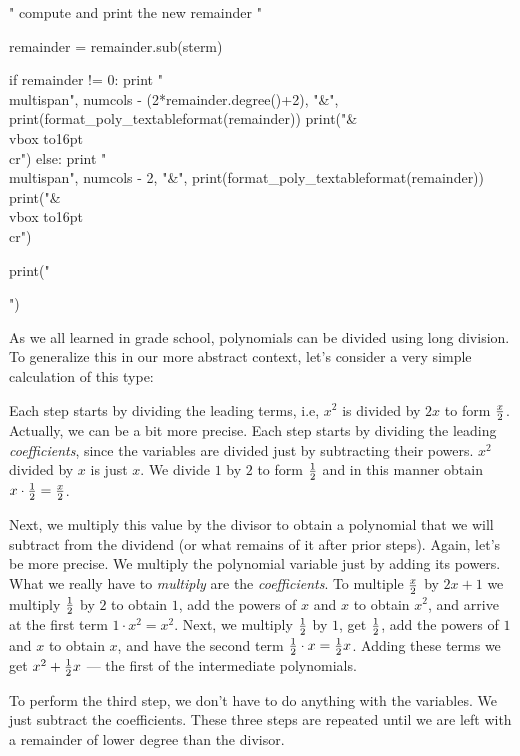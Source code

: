\begin{sympycode}
{{      " compute and print the new remainder "

      remainder = remainder.sub(sterm)

      if remainder != 0:
         print "\\multispan{", numcols - (2*remainder.degree()+2), "}&",
         print(format_poly_textableformat(remainder))
         print("&\\vbox to16pt{}\\cr")
      else:
         print "\\multispan{", numcols - 2, "}&",
         print(format_poly_textableformat(remainder))
         print("&\\vbox to16pt{}\\cr")

   print("}}")
\end{sympycode}

As we all learned in grade school, polynomials can be divided
using long division.  To generalize this in our more abstract
context, let's consider a very simple calculation of this type:


Each step starts by dividing the leading terms, i.e, $x^2$ is divided
by $2x$ to form $x\over 2$.  Actually, we can be a bit more precise.
Each step starts by dividing the leading {\it coefficients},
since the variables are divided just by subtracting their
powers. $x^2$ divided by $x$ is just $x$.  We divide $1$ by $2$
to form $1\over2$ and in this manner obtain $x\cdot{1\over2}={x\over2}$.

Next, we multiply this value by the divisor to obtain a polynomial
that we will subtract from the dividend (or what remains of it after
prior steps).  Again, let's be more precise.  We multiply the
polynomial variable just by adding its powers.  What we really have to
{\it multiply} are the {\it coefficients}.  To multiple $x\over2$ by
$2x+1$ we multiply $1\over2$ by $2$ to obtain $1$, add the powers of
$x$ and $x$ to obtain $x^2$, and arrive at the first term $1\cdot
x^2=x^2$.  Next, we multiply $1\over2$ by $1$, get $1\over2$, add the
powers of $1$ and $x$ to obtain $x$, and have the second term
${1\over2}\cdot x={1\over2}x$.  Adding these terms we get
$x^2+{1\over2}x$ --- the first of the intermediate polynomials.

To perform the third step, we don't have to do anything with
the variables.  We just subtract the coefficients.  These
three steps are repeated until we are left with a remainder
of lower degree than the divisor.

